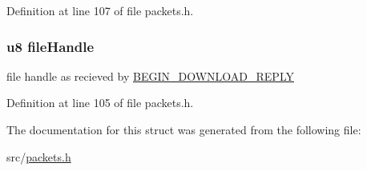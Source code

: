 Definition at line 107 of file packets.\+h.

\hypertarget{struct_c_o_n_t_i_n_u_e___d_o_w_n_l_o_a_d_a56fd3710165ab3fa738989d317905db6}{}
\subsubsection[{file\+Handle}]{ {\bf u8} file\+Handle}\label{struct_c_o_n_t_i_n_u_e___d_o_w_n_l_o_a_d_a56fd3710165ab3fa738989d317905db6}
file handle as recieved by \hyperlink{struct_b_e_g_i_n___d_o_w_n_l_o_a_d___r_e_p_l_y}{B\+E\+G\+I\+N\+\_\+\+D\+O\+W\+N\+L\+O\+A\+D\+\_\+\+R\+E\+P\+L\+Y} 

Definition at line 105 of file packets.\+h.



The documentation for this struct was generated from the following file\+:\begin{DoxyCompactItemize}
\item 
src/\hyperlink{packets_8h}{packets.\+h}\end{DoxyCompactItemize}
